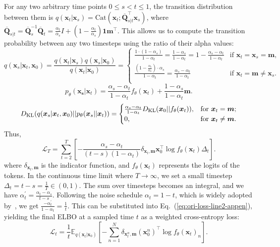 For any two arbitrary time points $0\leq s< t\leq 1$, the transition distribution between them is $q(\bm{x}_t|\bm{x}_s)=\text{Cat}(\bm{x}_t;\bm{\overline{Q}}_{s|t}^\top \bm{x}_s)$, where $\bm{\overline{Q}}_{s|t} = \bm{\overline{Q}}_s^{-1}\bm{\overline{Q}}_t=\frac{\alpha_t}{\alpha_s}I+(1-\frac{\alpha_t}{\alpha_s})\mathbf{1}\bm{m}^\top$. This allows us to compute the transition probability between any two timesteps using the ratio of their alpha values:
\begin{equation}
\label{eq:qxs-appen}
    q(\bm{x}_s|\bm{x}_t, \bm{x}_0) = \frac{q(\bm{x}_t|\bm{x}_s)q(\bm{x}_s|\bm{x}_0)}{q(\bm{x}_t|\bm{x}_0)}=
    \begin{cases}
        \frac{1\cdot(1-\alpha_s)}{1-\alpha_t} = \frac{1-\alpha_s}{1-\alpha_t} = 1- \frac{\alpha_s-\alpha_t}{1-\alpha_t} & \text{if } \bm{x}_t=\bm{x}_s=\bm{m}, \\
        \frac{(1-\frac{\alpha_t}{\alpha_s})\cdot\alpha_s}{1-\alpha_t} = \frac{\alpha_s-\alpha_t}{1-\alpha_t} & \text{if }\bm{x}_t=\bm{m}\neq \bm{x}_s. \\
    \end{cases}
\end{equation}
\begin{equation}
\label{eq:appen-px}
p_{\theta}(\bm{x_s}|\bm{x}_t)=\frac{\alpha_s-\alpha_t}{1-\alpha_t}f_{\theta}(\bm{x}_t)+\frac{1-\alpha_s}{1-\alpha_t}\bm{m}. 
\end{equation}
\begin{equation}
    D_{\mathrm{KL}}(q(\bm{x}_s|\bm{x}_t,\bm{x}_0)||p_{\theta}(\bm{x}_s||\bm{x}_t)) = 
    \begin{cases}
        \frac{\alpha_s-\alpha_t}{1-\alpha_t}D_{\mathrm{KL}}(\bm{x}_0||f_{\theta}(\bm{x}_t)), & \text{for } \bm{x}_t =\bm{m};\\
        0, & \text{for } \bm{x}_t \neq \bm{m}.\\
    \end{cases}
\end{equation}
Thus,
\begin{equation}
    \mathcal{L}_T = \sum_{t=2}^T [-\frac{\alpha_s-\alpha_t}{(t-s)(1-\alpha_t)}\delta_{\bm{x}_t,\bm{m}}\bm{x}_0^\top\log f_{\theta}(\bm{x}_t)\Delta_t].
\end{equation}
where $\delta_{\bm{x}_t,\bm{m}}$ is the indicator function, and $f_{\theta}(\bm{x}_t)$ represents the logits of the tokens.
In the continuous time limit where $T\rightarrow\infty$, we set a small timestep $\Delta_t=t-s=\frac{1}{T}\in(0,1)$. The sum over timesteps becomes an integral, and we have $\alpha_t^\prime=\frac{\alpha_t-\alpha_s}{t-s}$. Following the noise schedule $\alpha_t=1-t$, which is widely adopted by~\citet{shi2024simplified, sahoo2024simple, lou2023discrete, ou2024your}, we get $\frac{-\alpha_t^\prime}{1-\alpha_t}=\frac{1}{t}$.
This can be substituted into Eq.~(\ref{eq:ori-loss-line2-appen}), yielding the final ELBO at a sampled time $t$ as a weighted cross-entropy loss:
\begin{equation}
    \label{eq:dm-loss-appx}
    \mathcal{L}_{t} = \frac{1}{t}\mathbb{E}_{q(\bm{x}_t|\bm{x}_0)}\left[-\sum_{n=1}^N\delta_{\bm{x}_t^n,\bm{m}}(\bm{x}_0^{n})^\top\log f_{\theta}(\bm{x}_t)_n\right].
\end{equation}

